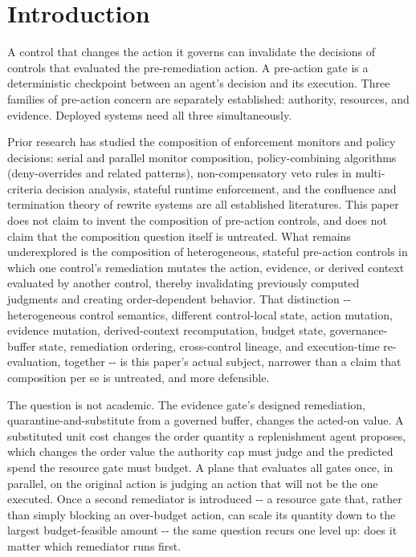 \documentclass[11pt,a4paper]{article}
\theoremstyle{definition}
\begin{document}
\section{Introduction}

A control that changes the action it governs can invalidate the decisions of controls that evaluated the pre-remediation action. A pre-action gate is a deterministic checkpoint between an agent's decision and its execution. Three families of pre-action concern are separately established: authority, resources, and evidence. Deployed systems need all three simultaneously.

Prior research has studied the composition of enforcement monitors and policy decisions: serial and parallel monitor composition, policy-combining algorithms (deny-overrides and related patterns), non-compensatory veto rules in multi-criteria decision analysis, stateful runtime enforcement, and the confluence and termination theory of rewrite systems are all established literatures. This paper does not claim to invent the composition of pre-action controls, and does not claim that the composition question itself is untreated. What remains underexplored is the composition of heterogeneous, stateful pre-action controls in which one control's remediation mutates the action, evidence, or derived context evaluated by another control, thereby invalidating previously computed judgments and creating order-dependent behavior. That distinction -{}- heterogeneous control semantics, different control-local state, action mutation, evidence mutation, derived-context recomputation, budget state, governance-buffer state, remediation ordering, cross-control lineage, and execution-time re-evaluation, together -{}- is this paper's actual subject, narrower than a claim that composition per se is untreated, and more defensible.

The question is not academic. The evidence gate's designed remediation, quarantine-and-substitute from a governed buffer, changes the acted-on value. A substituted unit cost changes the order quantity a replenishment agent proposes, which changes the order value the authority cap must judge and the predicted spend the resource gate must budget. A plane that evaluates all gates once, in parallel, on the original action is judging an action that will not be the one executed. Once a second remediator is introduced -{}- a resource gate that, rather than simply blocking an over-budget action, can scale its quantity down to the largest budget-feasible amount -{}- the same question recurs one level up: does it matter which remediator runs first.
\end{document}

